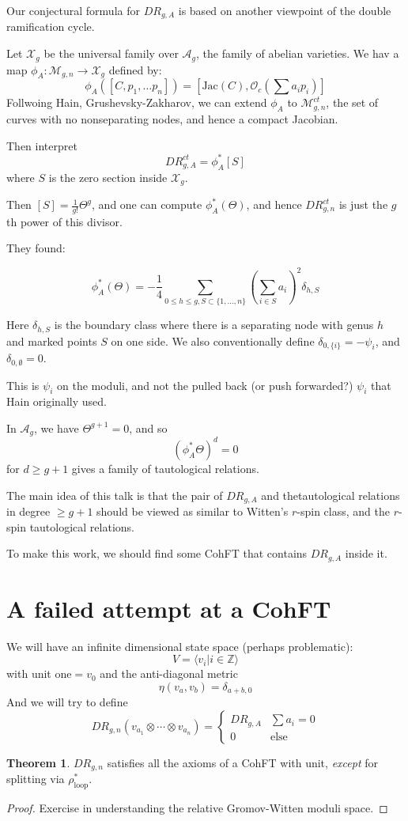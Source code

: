 \documentclass{amsart}
\theoremstyle{definition}
\newtheorem{theorem}{Theorem}
\newcommand{\OO}{\mathcal{O}}
\newcommand{\Z}{\mathbb{Z}}
\newcommand{\one}{\text{one}}
\newcommand{\M}{\mathcal{M}}
\begin{document}
Our conjectural formula for $DR_{g,A}$ is based on another viewpoint of the double ramification cycle.

Let $\mathcal{X}_g$ be the universal family over $\mathcal{A}_g$, the family of abelian varieties.  We hav a map $\phi_A:\M_{g,n}\to \mathcal{X}_g$ defined by:
$$\phi_A([C,p_1,\dots p_n])=[\text{Jac}(C),\OO_c(\sum a_ip_i)]$$
Follwoing Hain, Grushevsky-Zakharov, we can extend $\phi_A$ to $\M^{ct}_{g,n}$, the set of curves with no nonseparating nodes, and hence a compact Jacobian.

Then interpret
$$DR_{g,A}^{ct}=\phi_A^*[S]$$
where $S$ is the zero section inside $\mathcal{X}_g$.

Then $[S]=\frac{1}{g!}\Theta^g$, and one can compute $\phi_A^*(\Theta)$, and hence $DR^{ct}_{g,n}$ is just the $g$th power of this divisor.

They found:

$$\phi_A^*(\Theta)=-\frac{1}{4}\sum_{0\leq h\leq g, S\subset\{1,\dots, n\}} (\sum_{i\in S} a_i)^2\delta_{h, S}$$

Here $\delta_{h,S}$ is the boundary class where there is a separating node with genus $h$ and marked points $S$ on one side.  We also conventionally define $\delta_{0,\{i\}}=-\psi_i$, and $\delta_{0,\emptyset}=0$.

This is $\psi_i$ on the moduli, and not the pulled back (or push forwarded?) $\psi_i$ that Hain originally used.

In $\mathcal{A}_g$, we have $\Theta^{g+1}=0$, and so $$(\phi_A^*\Theta)^d=0$$ for $d\geq g+1$ gives a family of tautological relations.

The main idea of this talk is that the pair of $DR_{g,A}$ and thetautological relations in degree $\geq g+1$ should be viewed as similar to Witten's $r$-spin class, and the $r$-spin tautological relations.

To make this work, we should find some CohFT that contains $DR_{g,A}$ inside it.

\section{A failed attempt at a CohFT }

We will have an infinite dimensional state space (perhaps problematic):
$$V=\langle v_i | i\in \Z\rangle$$
with unit $\one=v_0$
and the anti-diagonal metric
$$\eta(v_a,v_b)=\delta_{a+b,0}$$
And we will try to define 
$$DR_{g,n}(v_{a_1}\otimes\cdots\otimes v_{a_n})=\left\{\begin{array}{ll} DR_{g,A}& \sum a_i=0 \\ 0 & \text{else}
\end{array}\right.
$$
\begin{theorem}
$DR_{g,n}$ satisfies all the axioms of a CohFT with unit, \emph{except} for splitting via $\rho_{\text{loop}}^*$.
\end{theorem}
\begin{proof}
Exercise in understanding the relative Gromov-Witten moduli space.
\end{proof}
\end{document}
